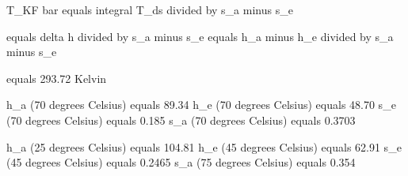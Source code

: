 T_KF bar equals integral T_ds divided by s_a minus s_e  

equals delta h divided by s_a minus s_e equals h_a minus h_e divided by s_a minus s_e  

equals 293.72 Kelvin  

h_a (70 degrees Celsius) equals 89.34  
h_e (70 degrees Celsius) equals 48.70  
s_e (70 degrees Celsius) equals 0.185  
s_a (70 degrees Celsius) equals 0.3703  

h_a (25 degrees Celsius) equals 104.81  
h_e (45 degrees Celsius) equals 62.91  
s_e (45 degrees Celsius) equals 0.2465  
s_a (75 degrees Celsius) equals 0.354